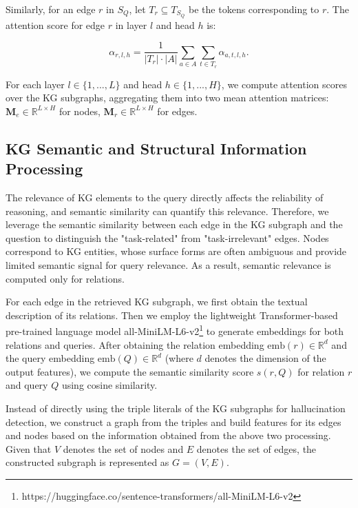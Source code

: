 \documentclass[11pt]{article}
\begin{document}
Similarly, for an edge $r$ in $S_Q$, let $T_r \subseteq T_{S_Q}$ be the tokens corresponding to $r$. The attention score for edge $r$ in layer $l$ and head $h$ is:

\begin{equation}
    \alpha_{r,l,h} = \frac{1}{|T_r| \cdot |A|} \sum_{a \in A} \sum_{t \in T_r} \alpha_{a,t,l,h}.
\end{equation}

For each layer $l \in \{1, ..., L\}$ and head $h \in \{1, ..., H\}$, we compute attention scores over the KG subgraphs, aggregating them into two mean attention matrices: $\mathbf{M}_e \in \mathbb{R}^{L \times H}$ for nodes, $\mathbf{M}_r \in \mathbb{R}^{L \times H}$ for edges.


\subsection{KG Semantic and Structural Information Processing}

The relevance of KG elements to the query directly affects the reliability of reasoning, and semantic similarity can quantify this relevance. Therefore, we leverage the semantic similarity between each edge in the KG subgraph and the question to distinguish the "task-related" from "task-irrelevant" edges. Nodes correspond to KG entities, whose surface forms are often ambiguous and provide limited semantic signal for query relevance. As a result, semantic relevance is computed only for relations.

For each edge in the retrieved KG subgraph, we first obtain the textual description of its relations. Then we employ the lightweight Transformer-based pre-trained language model all-MiniLM-L6-v2\footnote{https://huggingface.co/sentence-transformers/all-MiniLM-L6-v2} to generate embeddings for both relations and queries. After obtaining the relation embedding $\text{emb}(r) \in \mathbb{R}^d$ and the query embedding $\text{emb}(Q) \in \mathbb{R}^d$ (where $d$ denotes the dimension of the output features), we compute the semantic similarity score $s(r, Q)$ for relation $r$ and query $Q$ using cosine similarity.

Instead of directly using the triple literals of the KG subgraphs for hallucination detection, we construct a graph from the triples and build features for its edges and nodes based on the information obtained from the above two processing. Given that $V$ denotes the set of nodes and $E$ denotes the set of edges, the constructed subgraph is represented as $G = (V, E)$. 
\end{document}
